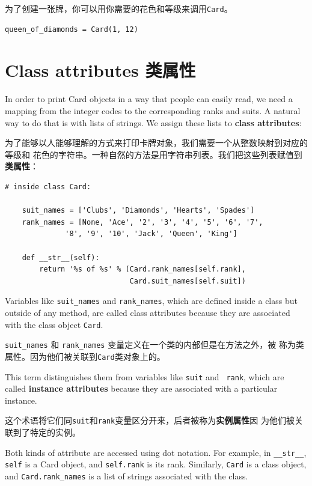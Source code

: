 \documentclass[10pt]{book}
\begin{document}
\begin{CJK}{UTF8}{gbsn}
为了创建一张牌，你可以用你需要的花色和等级来调用{\tt Card}。

\begin{verbatim}
queen_of_diamonds = Card(1, 12)
\end{verbatim}
%


\section{Class attributes 类属性}
\label{class.attribute}

In order to print Card objects in a way that people can easily
read, we need a mapping from the integer codes to the corresponding
ranks and suits.  A natural way to
do that is with lists of strings.  We assign these lists to {\bf class
attributes}:

为了能够以人能够理解的方式来打印卡牌对象，我们需要一个从整数映射到对应的等级和
花色的字符串。一种自然的方法是用字符串列表。我们把这些列表赋值到{\bf 类属性}：

\begin{verbatim}
# inside class Card:

    suit_names = ['Clubs', 'Diamonds', 'Hearts', 'Spades']
    rank_names = [None, 'Ace', '2', '3', '4', '5', '6', '7', 
              '8', '9', '10', 'Jack', 'Queen', 'King']

    def __str__(self):
        return '%s of %s' % (Card.rank_names[self.rank],
                             Card.suit_names[self.suit])
\end{verbatim}
%
Variables like \verb"suit_names" and \verb"rank_names", which are
defined inside a class but outside of any method, are called
class attributes because they are associated with the class object 
{\tt Card}.

\verb"suit_names" 和 \verb"rank_names" 变量定义在一个类的内部但是在方法之外，被
称为类属性。因为他们被关联到{\tt Card}类对象上的。

This term distinguishes them from variables like {\tt suit} and {\tt
  rank}, which are called {\bf instance attributes} because they are
associated with a particular instance.

这个术语将它们同{\tt suit}和{\tt rank}变量区分开来，后者被称为{\bf 实例属性}因
为他们被关联到了特定的实例。

Both kinds of attribute are accessed using dot notation.  For
example, in \verb"__str__", {\tt self} is a Card object,
and {\tt self.rank} is its rank.  Similarly, {\tt Card}
is a class object, and \verb"Card.rank_names" is a
list of strings associated with the class.


\end{CJK}
\end{document}
